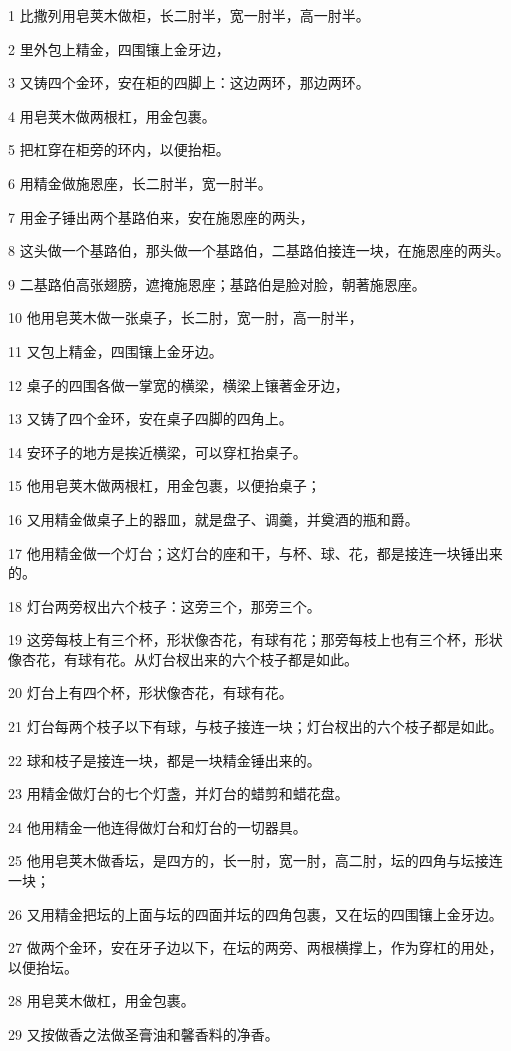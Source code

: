 \par 1 比撒列用皂荚木做柜，长二肘半，宽一肘半，高一肘半。
\par 2 里外包上精金，四围镶上金牙边，
\par 3 又铸四个金环，安在柜的四脚上：这边两环，那边两环。
\par 4 用皂荚木做两根杠，用金包裹。
\par 5 把杠穿在柜旁的环内，以便抬柜。
\par 6 用精金做施恩座，长二肘半，宽一肘半。
\par 7 用金子锤出两个基路伯来，安在施恩座的两头，
\par 8 这头做一个基路伯，那头做一个基路伯，二基路伯接连一块，在施恩座的两头。
\par 9 二基路伯高张翅膀，遮掩施恩座；基路伯是脸对脸，朝著施恩座。
\par 10 他用皂荚木做一张桌子，长二肘，宽一肘，高一肘半，
\par 11 又包上精金，四围镶上金牙边。
\par 12 桌子的四围各做一掌宽的横梁，横梁上镶著金牙边，
\par 13 又铸了四个金环，安在桌子四脚的四角上。
\par 14 安环子的地方是挨近横梁，可以穿杠抬桌子。
\par 15 他用皂荚木做两根杠，用金包裹，以便抬桌子；
\par 16 又用精金做桌子上的器皿，就是盘子、调羹，并奠酒的瓶和爵。
\par 17 他用精金做一个灯台；这灯台的座和干，与杯、球、花，都是接连一块锤出来的。
\par 18 灯台两旁杈出六个枝子：这旁三个，那旁三个。
\par 19 这旁每枝上有三个杯，形状像杏花，有球有花；那旁每枝上也有三个杯，形状像杏花，有球有花。从灯台杈出来的六个枝子都是如此。
\par 20 灯台上有四个杯，形状像杏花，有球有花。
\par 21 灯台每两个枝子以下有球，与枝子接连一块；灯台杈出的六个枝子都是如此。
\par 22 球和枝子是接连一块，都是一块精金锤出来的。
\par 23 用精金做灯台的七个灯盏，并灯台的蜡剪和蜡花盘。
\par 24 他用精金一他连得做灯台和灯台的一切器具。
\par 25 他用皂荚木做香坛，是四方的，长一肘，宽一肘，高二肘，坛的四角与坛接连一块；
\par 26 又用精金把坛的上面与坛的四面并坛的四角包裹，又在坛的四围镶上金牙边。
\par 27 做两个金环，安在牙子边以下，在坛的两旁、两根横撑上，作为穿杠的用处，以便抬坛。
\par 28 用皂荚木做杠，用金包裹。
\par 29 又按做香之法做圣膏油和馨香料的净香。

